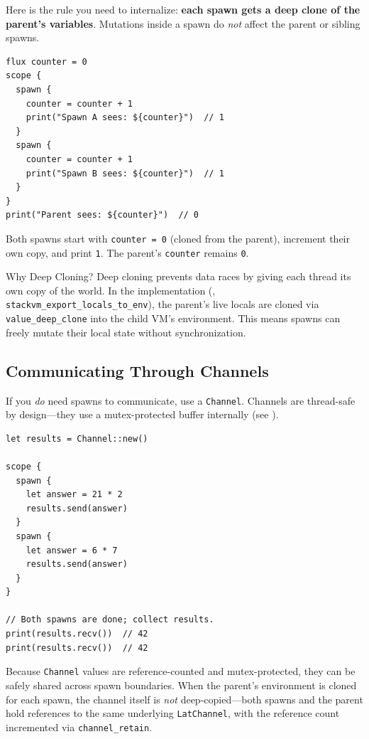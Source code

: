 Here is the rule you need to internalize: \textbf{each spawn gets a deep clone of the parent's variables}.
Mutations inside a spawn do \emph{not} affect the parent or sibling spawns.

\begin{lstlisting}[language=Lattice, caption={Spawns get independent copies}]
flux counter = 0
scope {
  spawn {
    counter = counter + 1
    print("Spawn A sees: ${counter}")  // 1
  }
  spawn {
    counter = counter + 1
    print("Spawn B sees: ${counter}")  // 1
  }
}
print("Parent sees: ${counter}")  // 0
\end{lstlisting}

Both spawns start with \lstinline|counter = 0| (cloned from the parent), increment their own copy, and print \lstinline|1|.
The parent's \lstinline|counter| remains \lstinline|0|.

\begin{notebox}{Why Deep Cloning?}
Deep cloning prevents data races by giving each thread its own copy of the world.
In the implementation (, \texttt{stackvm\_export\_locals\_to\_env}), the parent's live locals are cloned via \texttt{value\_deep\_clone} into the child VM's environment.
This means spawns can freely mutate their local state without synchronization.
\end{notebox}

\subsection{Communicating Through Channels}

If you \emph{do} need spawns to communicate, use a \lstinline|Channel|.
Channels are thread-safe by design---they use a mutex-protected buffer internally (see ).

\begin{lstlisting}[language=Lattice, caption={Spawns communicating via a channel}]
let results = Channel::new()

scope {
  spawn {
    let answer = 21 * 2
    results.send(answer)
  }
  spawn {
    let answer = 6 * 7
    results.send(answer)
  }
}

// Both spawns are done; collect results.
print(results.recv())  // 42
print(results.recv())  // 42
\end{lstlisting}

Because \lstinline|Channel| values are reference-counted and mutex-protected, they can be safely shared across spawn boundaries.
When the parent's environment is cloned for each spawn, the channel itself is \emph{not} deep-copied---both spawns and the parent hold references to the same underlying \texttt{LatChannel}, with the reference count incremented via \texttt{channel\_retain}.

